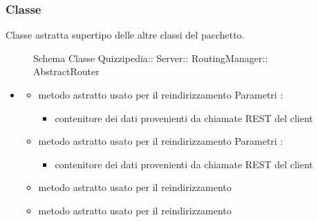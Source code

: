 \subsubsection{Classe }
Classe astratta supertipo delle altre classi del pacchetto.
\begin{figure}[H]
\centering
\noindent{}
\caption[Schema Classe AbstractRouter]{Schema Classe Quizzipedia:: Server:: RoutingManager:: AbstractRouter}
\end{figure}
\begin{itemize}
\item {}
\begin{itemize}
\item {}
\newline
metodo astratto usato per il reindirizzamento
\newline
Parametri :
\begin{itemize}
\item {}
\newline
contenitore dei dati provenienti da chiamate REST del client
\end{itemize}
\item {}
\newline
metodo astratto usato per il reindirizzamento
\newline
Parametri :
\begin{itemize}
\item {}
\newline
contenitore dei dati provenienti da chiamate REST del client
\end{itemize}
\item {}
\newline
metodo astratto usato per il reindirizzamento
\newline
\item {}
\newline
metodo astratto usato per il reindirizzamento
\newline
\end{itemize}
\end{itemize}
